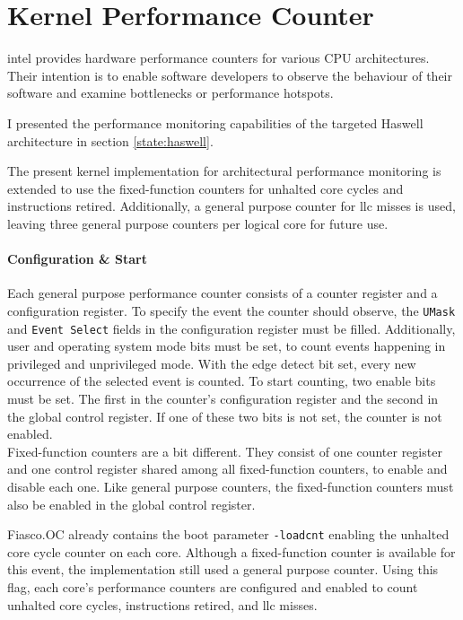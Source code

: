 \section{Kernel Performance Counter}
\label{impl:perfcounter}

\gls{intel} provides hardware performance counters for various CPU
architectures.
Their intention is to enable software developers to observe the behaviour of
their software and examine bottlenecks or performance hotspots.

I presented the performance monitoring capabilities of the targeted Haswell
architecture in section \ref{state:haswell}.

The present kernel implementation for architectural performance monitoring is
extended to use the fixed-function counters for unhalted core cycles and
instructions retired.
Additionally, a general purpose counter for \gls{llc} misses is used,
leaving three general purpose counters per logical core for future use.

\paragraph{Configuration \& Start}
Each general purpose performance counter consists of a counter register and a
configuration register.
To specify the event the counter should observe, the \texttt{UMask} and
\texttt{Event Select} fields in the configuration register must be filled.
Additionally, user and operating system mode bits must be set, to count events
happening in privileged and unprivileged mode.
With the edge detect bit set, every new occurrence of the selected event is
counted.
To start counting, two enable bits must be set.
The first in the counter's configuration register and the second in the global
control register.
If one of these two bits is not set, the counter is not enabled.
\\

Fixed-function counters are a bit different.
They consist of one counter register and one control register shared among all
fixed-function counters, to enable and disable each one.
Like general purpose counters, the fixed-function counters must also be enabled
in the global control register.

Fiasco.OC already contains the boot parameter \texttt{-loadcnt} enabling the
unhalted core cycle counter on each core.
Although a fixed-function counter is available for this event, the
implementation still used a general purpose counter.
Using this flag, each core's performance counters are configured and enabled to
count unhalted core cycles, instructions retired, and \gls{llc} misses.

